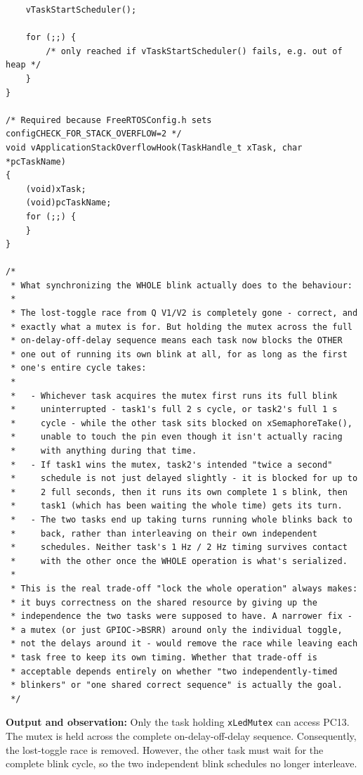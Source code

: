 ﻿\documentclass[12pt,a4paper]{article}
\begin{document}
\begin{lstlisting}
    vTaskStartScheduler();

    for (;;) {
        /* only reached if vTaskStartScheduler() fails, e.g. out of heap */
    }
}

/* Required because FreeRTOSConfig.h sets configCHECK_FOR_STACK_OVERFLOW=2 */
void vApplicationStackOverflowHook(TaskHandle_t xTask, char *pcTaskName)
{
    (void)xTask;
    (void)pcTaskName;
    for (;;) {
    }
}

/*
 * What synchronizing the WHOLE blink actually does to the behaviour:
 *
 * The lost-toggle race from Q V1/V2 is completely gone - correct, and
 * exactly what a mutex is for. But holding the mutex across the full
 * on-delay-off-delay sequence means each task now blocks the OTHER
 * one out of running its own blink at all, for as long as the first
 * one's entire cycle takes:
 *
 *   - Whichever task acquires the mutex first runs its full blink
 *     uninterrupted - task1's full 2 s cycle, or task2's full 1 s
 *     cycle - while the other task sits blocked on xSemaphoreTake(),
 *     unable to touch the pin even though it isn't actually racing
 *     with anything during that time.
 *   - If task1 wins the mutex, task2's intended "twice a second"
 *     schedule is not just delayed slightly - it is blocked for up to
 *     2 full seconds, then it runs its own complete 1 s blink, then
 *     task1 (which has been waiting the whole time) gets its turn.
 *   - The two tasks end up taking turns running whole blinks back to
 *     back, rather than interleaving on their own independent
 *     schedules. Neither task's 1 Hz / 2 Hz timing survives contact
 *     with the other once the WHOLE operation is what's serialized.
 *
 * This is the real trade-off "lock the whole operation" always makes:
 * it buys correctness on the shared resource by giving up the
 * independence the two tasks were supposed to have. A narrower fix -
 * a mutex (or just GPIOC->BSRR) around only the individual toggle,
 * not the delays around it - would remove the race while leaving each
 * task free to keep its own timing. Whether that trade-off is
 * acceptable depends entirely on whether "two independently-timed
 * blinkers" or "one shared correct sequence" is actually the goal.
 */
\end{lstlisting}

\textbf{Output and observation:}
Only the task holding \texttt{xLedMutex} can access PC13. The mutex is held
across the complete on-delay-off-delay sequence. Consequently, the lost-toggle
race is removed. However, the other task must wait for the complete blink
cycle, so the two independent blink schedules no longer interleave.
\end{document}
